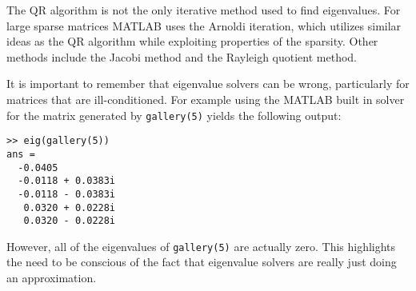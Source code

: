 The QR algorithm is not the only iterative method used to find eigenvalues. For large sparse matrices MATLAB uses the Arnoldi iteration, which utilizes similar ideas as the QR algorithm while exploiting properties of the sparsity. Other methods include the Jacobi method and the Rayleigh quotient method.

It is important to remember that eigenvalue solvers can be wrong, particularly for matrices that are ill-conditioned. For example using the MATLAB built in solver for the matrix generated by {\tt gallery(5)} yields the following output:
\begin{verbatim}
>> eig(gallery(5))
ans =
  -0.0405          
  -0.0118 + 0.0383i
  -0.0118 - 0.0383i
   0.0320 + 0.0228i
   0.0320 - 0.0228i
\end{verbatim}
However, all of the eigenvalues of {\tt gallery(5)} are actually zero. This highlights the need to be conscious of the fact that eigenvalue solvers are really just doing an approximation.
